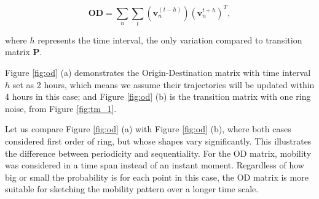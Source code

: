 \documentclass[12pt]{article}
\theoremstyle{definition}
\begin{document}
\begin{equation*}
    \textbf{OD}=\sum_{n}\sum_{t}(\boldsymbol{v}_{n}^{(t-h)})(\boldsymbol{v}_{n}^{t+h})^{T},
\end{equation*}

where \(h\) represents the time interval, the only variation compared to transition matrix \textbf{P}. 


Figure \ref{fig:od} (a) demonstrates the Origin-Destination matrix with time interval \(h\) set as 2 hours, which means we assume their trajectories will be updated within 4 hours in this case; and Figure \ref{fig:od} (b) is the transition matrix with one ring noise, from Figure \ref{fig:tm_1}.

Let us compare Figure \ref{fig:od} (a) with Figure \ref{fig:od} (b), where both cases considered first order of ring, but whose shapes vary significantly. This illustrates the difference between periodicity and sequentiality. For the OD matrix, mobility was considered in a time span instead of an instant moment. Regardless of how big or small the probability is for each point in this case, the OD matrix is more suitable for sketching the mobility pattern over a longer time scale.
\end{document}
